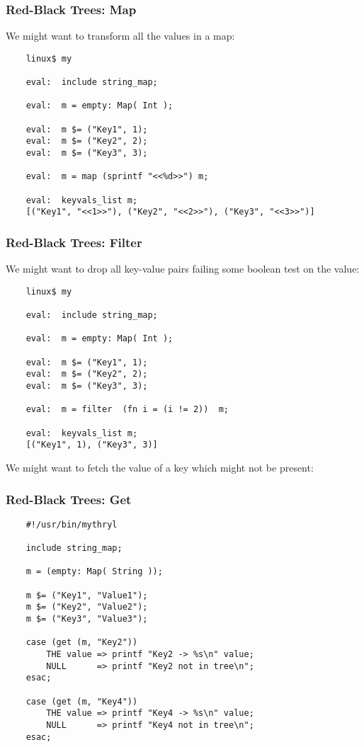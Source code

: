\cutend*

\subsubsection{Red-Black Trees:  Map}

We might want to transform all the values in a map:

\begin{verbatim}
    linux$ my

    eval:  include string_map;

    eval:  m = empty: Map( Int );

    eval:  m $= ("Key1", 1);
    eval:  m $= ("Key2", 2);
    eval:  m $= ("Key3", 3);

    eval:  m = map (sprintf "<<%d>>") m;

    eval:  keyvals_list m;
    [("Key1", "<<1>>"), ("Key2", "<<2>>"), ("Key3", "<<3>>")]
\end{verbatim}

\cutend*

\subsubsection{Red-Black Trees:  Filter}

We might want to drop all key-value pairs 
failing some boolean test on the value:

\begin{verbatim}
    linux$ my

    eval:  include string_map;

    eval:  m = empty: Map( Int );

    eval:  m $= ("Key1", 1);
    eval:  m $= ("Key2", 2);
    eval:  m $= ("Key3", 3);

    eval:  m = filter  (fn i = (i != 2))  m;

    eval:  keyvals_list m;
    [("Key1", 1), ("Key3", 3)]
\end{verbatim}

We might want to fetch the value of a key 
which might not be present:


\cutend*

\subsubsection{Red-Black Trees:  Get}

\begin{verbatim}
    #!/usr/bin/mythryl

    include string_map;

    m = (empty: Map( String ));

    m $= ("Key1", "Value1");
    m $= ("Key2", "Value2");
    m $= ("Key3", "Value3");

    case (get (m, "Key2"))
        THE value => printf "Key2 -> %s\n" value;
        NULL      => printf "Key2 not in tree\n";
    esac;

    case (get (m, "Key4"))
        THE value => printf "Key4 -> %s\n" value;
        NULL      => printf "Key4 not in tree\n";
    esac;
\end{verbatim}

